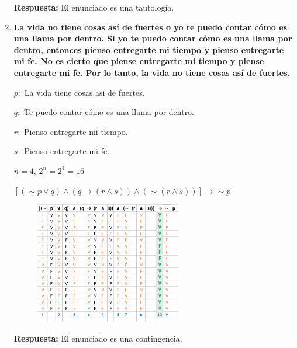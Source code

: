 \documentclass[12pt]{article}
\begin{document}
\begin{enumerate}
                \textbf{Respuesta:} El enunciado es una tautología.
             \newpage
            \item \textbf{La vida no tiene cosas así de fuertes o yo te puedo contar cómo es una llama por dentro. Si yo te puedo contar cómo es una llama por dentro, entonces pienso entregarte mi tiempo y pienso entregarte mi fe. No es cierto que piense entregarte mi tiempo y piense entregarte mi fe. Por lo tanto, la vida no tiene cosas así de fuertes.}
                \par$p:$ La vida tiene cosas asi de fuertes.
                \par$q:$ Te puedo contar cómo es una llama por dentro.
                \par$r:$ Pienso entregarte mi tiempo.
                \par$s:$ Pienso entregarte mi fe.
                \par$n = 4$, $2^n = 2^4 = 16$
                \par\vspace{0.5cm}$[(\sim p \vee q) \wedge (q \longrightarrow (r \wedge s)) \wedge (\sim (r \wedge s))] \longrightarrow \sim p$
                
                \begin{figure}[!h]
                    \centering
                    \includegraphics[width=0.6\textwidth]{Img/Tarea4_ej4.png}
                \end{figure}

                \textbf{Respuesta:} El enunciado es una contingencia.

        \end{enumerate}
\end{document}
